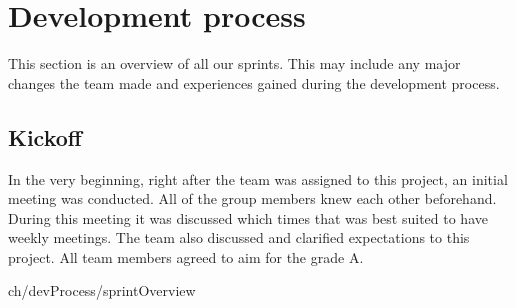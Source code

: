 \chapter{Development process}
\label{sec:sprintOverview}
This section is an overview of all our sprints. This may include any major changes the team made and experiences gained during the development process. 

\section{Kickoff}
In the very beginning, right after the team was assigned to this project, an initial meeting was conducted. All of the group members knew each other beforehand. During this meeting it was discussed which times that was best suited to have weekly meetings. The team also discussed and clarified expectations to this project. All team members agreed to aim for the grade A.

 ch/devProcess/sprintOverview









